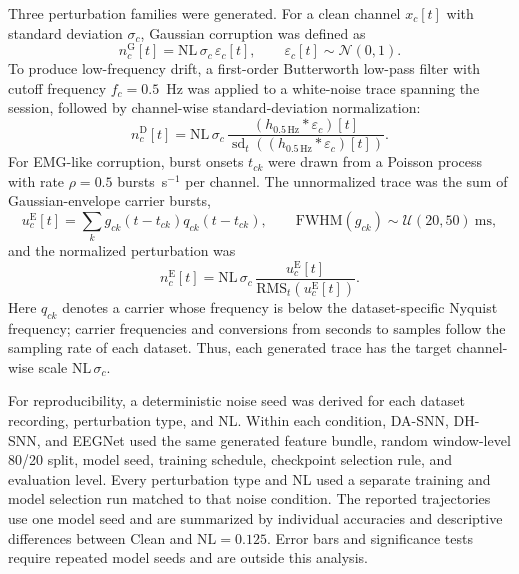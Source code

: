 \documentclass[12pt]{article}
\begin{document}
Three perturbation families were generated. For a clean channel $x_c[t]$ with standard deviation $\sigma_c$, Gaussian corruption was defined as
\begin{equation}
n^{\mathrm{G}}_c[t]=\mathrm{NL}\,\sigma_c\,\varepsilon_c[t],
\qquad \varepsilon_c[t]\sim\mathcal{N}(0,1).
\label{eq:gaussian_perturbation}
\end{equation}
To produce low-frequency drift, a first-order Butterworth low-pass filter with cutoff frequency $f_c=0.5$~Hz was applied to a white-noise trace spanning the session, followed by channel-wise standard-deviation normalization:
\begin{equation}
n^{\mathrm{D}}_c[t]=\mathrm{NL}\,\sigma_c\,
\frac{(h_{0.5\,\mathrm{Hz}}\ast\varepsilon_c)[t]}{\operatorname{sd}_t\!\left((h_{0.5\,\mathrm{Hz}}\ast\varepsilon_c)[t]\right)}.
\label{eq:drift_perturbation}
\end{equation}
For EMG-like corruption, burst onsets $t_{ck}$ were drawn from a Poisson process with rate $\rho=0.5$ bursts~s$^{-1}$ per channel. The unnormalized trace was the sum of Gaussian-envelope carrier bursts,
\begin{equation}
u^{\mathrm{E}}_c[t]=\sum_k g_{ck}(t-t_{ck})q_{ck}(t-t_{ck}),
\qquad
\mathrm{FWHM}(g_{ck})\sim\mathcal{U}(20,50)~\mathrm{ms},
\label{eq:emg_envelope}
\end{equation}
and the normalized perturbation was
\begin{equation}
n^{\mathrm{E}}_c[t]=\mathrm{NL}\,\sigma_c\,
\frac{u^{\mathrm{E}}_c[t]}{\mathrm{RMS}_t\!\left(u^{\mathrm{E}}_c[t]\right)}.
\label{eq:emg_perturbation}
\end{equation}
Here $q_{ck}$ denotes a carrier whose frequency is below the dataset-specific Nyquist frequency; carrier frequencies and conversions from seconds to samples follow the sampling rate of each dataset. Thus, each generated trace has the target channel-wise scale $\mathrm{NL}\,\sigma_c$.

For reproducibility, a deterministic noise seed was derived for each dataset recording, perturbation type, and NL. Within each condition, DA-SNN, DH-SNN, and EEGNet used the same generated feature bundle, random window-level 80/20 split, model seed, training schedule, checkpoint selection rule, and evaluation level. Every perturbation type and NL used a separate training and model selection run matched to that noise condition. The reported trajectories use one model seed and are summarized by individual accuracies and descriptive differences between Clean and $\mathrm{NL}=0.125$. Error bars and significance tests require repeated model seeds and are outside this analysis.
\end{document}
